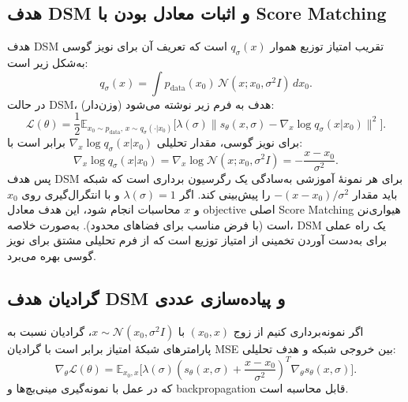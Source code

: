 \subsection{هدف DSM و اثبات معادل بودن با Score Matching}
هدف DSM تقریب امتیاز توزیع هموار \(q_{\sigma}(x)\) است که تعریف آن برای نویز گوسی به‌شکل زیر است:
\begin{equation}
q_{\sigma}(x) = \int p_{\text{data}}(x_0)\,\mathcal{N}(x; x_0, \sigma^2 I)\,dx_0.
\end{equation}
در حالت DSM، هدف به فرم زیر نوشته می‌شود (وزن‌دار):
\begin{equation}\label{eq:dsm_repeat}
\mathcal{L}(\theta)=\frac{1}{2} \mathbb{E}_{x_0\sim p_{\text{data}},\,x\sim q_{\sigma}(\cdot|x_0)}\big[\lambda(\sigma) \| s_{\theta}(x,\sigma) - \nabla_x \log q_{\sigma}(x|x_0) \|^2\big].
\end{equation}
برای نویز گوسی، مقدار تحلیلی \(\nabla_x \log q_{\sigma}(x|x_0)\) برابر است با:
\begin{equation}
\nabla_x \log q_{\sigma}(x|x_0) = \nabla_x \log \mathcal{N}(x; x_0,\sigma^2 I) = -\frac{x - x_0}{\sigma^2}.
\end{equation}
پس هدف DSM برای هر نمونهٔ آموزشی به‌سادگی یک رگرسیون برداری است که شبکه باید مقدار \(-(x-x_0)/\sigma^2\) را پیش‌بینی کند. اگر \(\lambda(\sigma)=1\) و با انتگرال‌گیری روی \(x_0\) و \(x\) محاسبات انجام شود، این هدف معادل objective اصلی Score Matching هیواری‌نن است (با فرض مناسب برای فضاهای محدود). به‌صورت خلاصه، DSM یک راه عملی برای به‌دست آوردن تخمینی از امتیاز توزیع است که از فرم تحلیلی مشتق برای نویز گوسی بهره می‌برد.

\subsection{گرادیان هدف DSM و پیاده‌سازی عددی}
اگر نمونه‌برداری کنیم از زوج \((x_0, x)\) با \(x\sim \mathcal{N}(x_0,\sigma^2 I)\)، گرادیان نسبت به پارامترهای شبکهٔ امتیاز برابر است با گرادیان MSE بین خروجی شبکه و هدف تحلیلی:
\begin{equation}
\nabla_{\theta} \mathcal{L}(\theta) = \mathbb{E}_{x_0,x}\big[\lambda(\sigma) (s_{\theta}(x,\sigma) + \frac{x-x_0}{\sigma^2})^T \nabla_{\theta} s_{\theta}(x,\sigma)\big].
\end{equation}
که در عمل با نمونه‌گیری مینی‌بچ‌ها و backpropagation قابل محاسبه است.

